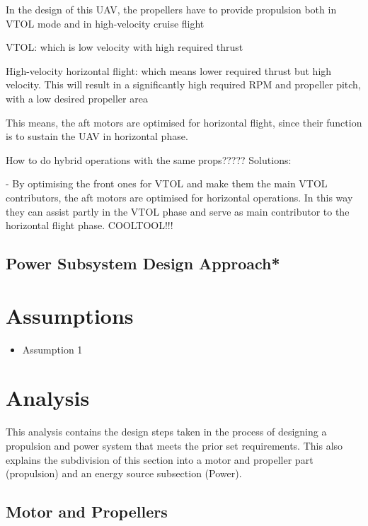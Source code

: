 In the design of this UAV, the propellers have to provide propulsion both in VTOL mode and in high-velocity cruise flight

VTOL: which is low velocity with high required thrust

High-velocity horizontal flight: which means lower required thrust but high velocity. This will result in a significantly high required RPM and propeller pitch, with a low desired propeller area



This means, the aft motors are optimised for horizontal flight, since their function is to sustain the UAV in horizontal phase.

How to do hybrid operations with the same props????? Solutions:

- By optimising the front ones for VTOL and make them the main VTOL contributors, the aft motors are optimised for horizontal operations. In this way they can assist partly in the VTOL phase and serve as main contributor to the horizontal flight phase. 
COOLTOOL!!! 


\subsection{Power Subsystem Design Approach*}



\section{Assumptions}
\label{sec:AssuPNP}

\begin{itemize}
    \item Assumption 1
\end{itemize}

\section{Analysis} %
\label{sec:AnalPNP}
This analysis contains the design steps taken in the process of designing a propulsion and power system that meets the prior set requirements. This also explains the subdivision of this section into a motor and propeller part (propulsion) and an energy source subsection (Power).

\subsection{Motor and Propellers}

